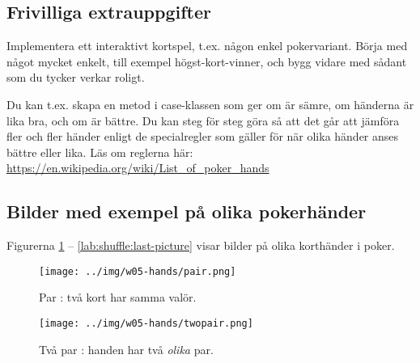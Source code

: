 \subsection{Frivilliga extrauppgifter}

\Task Implementera ett interaktivt kortspel, t.ex. någon enkel pokervariant. Börja med något mycket enkelt, till exempel högst-kort-vinner, och bygg vidare med sådant som du tycker verkar roligt.

Du kan t.ex. skapa en metod  i case-klassen  som ger  om  är sämre,  om händerna är lika bra, och  om  är bättre. Du kan steg för steg göra så att det går att jämföra fler och fler händer enligt de specialregler som gäller för när olika händer anses bättre eller lika. Läs om reglerna här: \url{https://en.wikipedia.org/wiki/List_of_poker_hands}


\subsection{Bilder med exempel på olika pokerhänder}\label{shuffle:hands}

Figurerna \ref{lab:shuffle:first-picture} -- \ref{lab:shuffle:last-picture} visar bilder på olika korthänder i poker.

\newcommand{\CardWidth}{0.45\textwidth}
\newcommand{\CardCaptionWidth}{0.5\textwidth}

\begin{figure}[H]
 \begin{minipage}[c]{\CardWidth}
  \texttt{[image: ../img/w05-hands/pair.png]}
 \end{minipage}\hfill
 \begin{minipage}[c]{\CardCaptionWidth}
  \caption{Par : två kort har samma valör.}
   \label{lab:shuffle:first-picture}
 \end{minipage}
\end{figure}

\begin{figure}[H]
 \begin{minipage}[c]{\CardWidth}
  \texttt{[image: ../img/w05-hands/twopair.png]}
 \end{minipage}\hfill
 \begin{minipage}[c]{\CardCaptionWidth}
  \caption{Två par : handen har två \emph{olika} par.}
 \end{minipage}
\end{figure}

